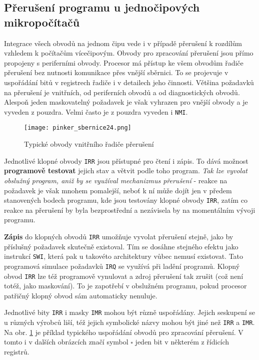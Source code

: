    \subsection{Přerušení programu u jednočipových mikropočítačů}
      Integrace všech obvodů na jednom čipu vede i v případě přerušení k rozdílům vzhledem k 
      počítačům vícečipovým. Obvody pro zpracování přerušení jsou přímo propojeny s periferními 
      obvody. Procesor má přístup ke všem obvodům řadiče přerušení bez nutnosti komunikace přes 
      vnější sběrnici. To se projevuje v uspořádání bitů v registrech řadiče i v detailech jeho 
      činnosti. Většina požadavků na přerušení je vnitřních, od periferních obvodů a od 
      diagnostických obvodů. Alespoň jeden maskovatelný požadavek je však vyhrazen pro vnější 
      obvody a je vyveden z pouzdra. Velmi často je z pouzdra vyveden i \texttt{NMI}.
      
      \begin{figure}[ht!] %
        \centering
        \texttt{[image: pinker\_sbernice24.png]}
        \caption{Typické obvody vnitřního řadiče přerušení}
        \label{MIT:fig_sbernice24}
      \end{figure}

      Jednotlivé klopné obvody \texttt{IRR} jsou přístupné pro čtení i zápis. To dává možnost 
      \textbf{programově testovat} jejich stav a větvit podle toho program. \emph{Tak lze vyvolat 
      obslužný program, aniž by se využíval mechanizmus přerušení} - reakce na požadavek je však 
      mnohem pomalejší, neboť k ní může dojít jen v předem stanovených bodech programu, kde jsou 
      testovány klopné obvody \texttt{IRR}, zatím co reakce na přerušení by byla bezprostřední a 
      nezávisela by na momentálním vývoji programu.
      
      \textbf{Zápis} do klopných obvodů \texttt{IRR} umožňuje vyvolat přerušení stejně, jako by 
      příslušný požadavek skutečně existoval. Tím se dosáhne stejného efektu jako instrukcí 
      \texttt{SWI}, která pak u takovéto architektury vůbec nemusí existovat. Tato programová 
      simulace požadavků \texttt{IRQ} se využívá při ladění programů. Klopný obvod \texttt{IRR} lze 
      též programově vynulovat a zdroj přerušení tak zrušit (což není totéž, jako maskování). To je 
      zapotřebí v obslužném programu, pokud procesor patřičný klopný obvod sám automaticky nenuluje.
      
      Jednotlivé bity \texttt{IRR} i masky \texttt{IMR} mohou být různě uspořádány. Jejich 
      seskupení se u různých výrobců liší, též jejich symbolické názvy mohou být jiné než 
      \texttt{IRR} a \texttt{IMR}. Na obr. \ref{MIT:fig_sbernice24} je příklad typického uspořádání 
      obvodů pro zpracování přerušení. V tomto i v dalších obrázcích značí symbol \(\square\) jeden 
      bit v některém z řídicích registrů.
      
